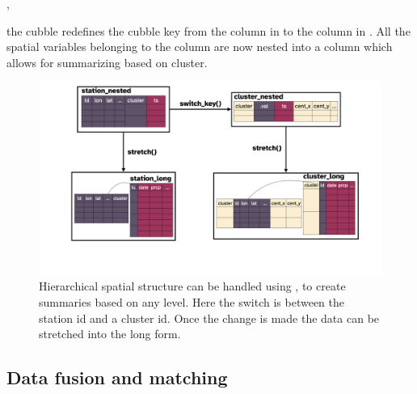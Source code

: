 \documentclass[
]{jss}
\begin{document}
,

the cubble redefines the cubble key from the  column in  to the  column in . All the spatial variables belonging to the  column are now nested into a  column which allows for summarizing based on cluster.

\begin{CodeChunk}
\begin{figure}

{\centering \includegraphics[width=1\linewidth,height=0.4\textheight]{../figures/diagram-keynotes/diagram-keynotes.003} 

}

\caption[Hierarchical spatial structure can be handled using , to create summaries based on any level]{Hierarchical spatial structure can be handled using , to create summaries based on any level. Here the switch is between the station id and a cluster id. Once the change is made the data can be stretched into the long form.}\label{fig:illu-hier}
\end{figure}
\end{CodeChunk}

\hypertarget{matching}{%
\subsection{Data fusion and matching}\label{matching}}
\end{document}
